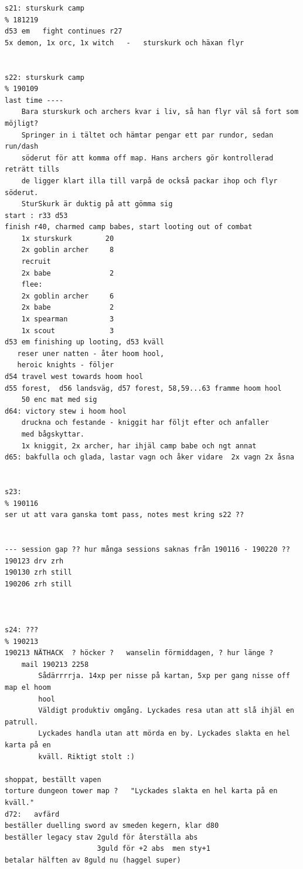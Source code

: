 \begin{verbatim}
s21: sturskurk camp                                                     % 181219
d53 em   fight continues r27
5x demon, 1x orc, 1x witch   -   sturskurk och häxan flyr


s22: sturskurk camp                                                     % 190109
last time ----
    Bara sturskurk och archers kvar i liv, så han flyr väl så fort som möjligt?
    Springer in i tältet och hämtar pengar ett par rundor, sedan run/dash 
    söderut för att komma off map. Hans archers gör kontrollerad reträtt tills 
    de ligger klart illa till varpå de också packar ihop och flyr söderut.
    SturSkurk är duktig på att gömma sig
start : r33 d53
finish r40, charmed camp babes, start looting out of combat
    1x sturskurk        20
    2x goblin archer     8
    recruit
    2x babe              2
    flee:
    2x goblin archer     6
    2x babe              2
    1x spearman          3
    1x scout             3
d53 em finishing up looting, d53 kväll
   reser uner natten - åter hoom hool,
   heroic knights - följer
d54 travel west towards hoom hool
d55 forest,  d56 landsväg, d57 forest, 58,59...63 framme hoom hool
    50 enc mat med sig
d64: victory stew i hoom hool
    druckna och festande - kniggit har följt efter och anfaller
    med bågskyttar. 
    1x kniggit, 2x archer, har ihjäl camp babe och ngt annat
d65: bakfulla och glada, lastar vagn och åker vidare  2x vagn 2x åsna


s23:                                                                    % 190116
ser ut att vara ganska tomt pass, notes mest kring s22 ??


--- session gap ?? hur många sessions saknas från 190116 - 190220 ??
190123 drv zrh
190130 zrh still
190206 zrh still



s24: ???                                                                % 190213
190213 NÄTHACK  ? höcker ?   wanselin förmiddagen, ? hur länge ?
    mail 190213 2258
        Sådärrrrja. 14xp per nisse på kartan, 5xp per gang nisse off map el hoom
        hool
        Väldigt produktiv omgång. Lyckades resa utan att slå ihjäl en patrull.
        Lyckades handla utan att mörda en by. Lyckades slakta en hel karta på en
        kväll. Riktigt stolt :)

shoppat, beställt vapen
torture dungeon tower map ?   "Lyckades slakta en hel karta på en kväll."
d72:   avfärd
beställer duelling sword av smeden kegern, klar d80
beställer legacy stav 2guld för återställa abs
                      3guld för +2 abs  men sty+1
betalar hälften av 8guld nu (haggel super)




\end{verbatim}

